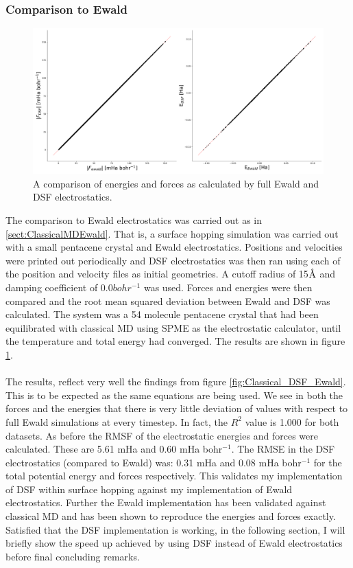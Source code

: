 \subsubsection{Comparison to Ewald}
\begin{figure}[htp]
  \includegraphics[width=\textwidth]{../img/ES/DSF_vs_Ewald_FSSH.png}
  \caption{\label{fig:DSF_vs_EwaldSH}A comparison of energies and forces as calculated by full Ewald and DSF electrostatics.}
\end{figure}
The comparison to Ewald electrostatics was carried out as in \ref{sect:ClassicalMDEwald}. That is, a surface hopping simulation was carried out with a small pentacene crystal and Ewald electrostatics. Positions and velocities were printed out periodically and DSF electrostatics was then ran using each of the position and velocity files as initial geometries. A cutoff radius of 15$\text{\normalfont\AA}$ and damping coefficient of 0.0$bohr^{-1}$ was used. Forces and energies were then compared and the root mean squared deviation between Ewald and DSF was calculated. The system was a 54 molecule pentacene crystal that had been equilibrated with classical MD using SPME as the electrostatic calculator, until the temperature and total energy had converged. The results are shown in figure \ref{fig:DSF_vs_EwaldSH}. 
\\\\
The results, reflect very well the findings from figure \ref{fig:Classical_DSF_Ewald}. This is to be expected as the same equations are being used. We see in both the forces and the energies that there is very little deviation of values with respect to full Ewald simulations at every timestep. In fact, the $R^2$ value is 1.000 for both datasets. As before the RMSF of the electrostatic energies and forces were calculated. These are 5.61 mHa and 0.60 mHa bohr$^{-1}$. The RMSE in the DSF electrostatics (compared to Ewald) was: 0.31 mHa and 0.08 mHa bohr$^{-1}$ for the total potential energy and forces respectively. This validates my implementation of DSF within surface hopping against my implementation of Ewald electrostatics. Further the Ewald implementation has been validated against classical MD and has been shown to reproduce the energies and forces exactly. Satisfied that the DSF implementation is working, in the following section, I will briefly show the speed up achieved by using DSF instead of Ewald electrostatics before final concluding remarks.


